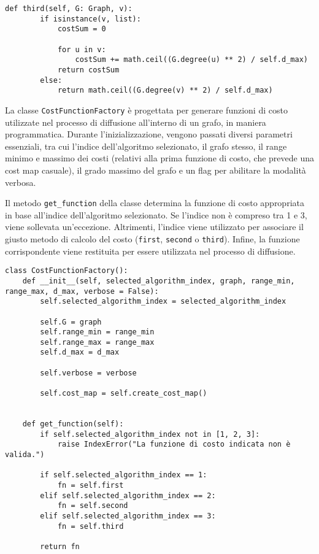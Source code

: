 \begin{code}
\begin{verbatim}
def third(self, G: Graph, v):
        if isinstance(v, list):
            costSum = 0

            for u in v:
                costSum += math.ceil((G.degree(u) ** 2) / self.d_max)
            return costSum
        else:
            return math.ceil((G.degree(v) ** 2) / self.d_max)
\end{verbatim}
\end{code}

La classe \texttt{CostFunctionFactory} è progettata per generare funzioni di costo utilizzate nel processo di diffusione all'interno di un grafo, in maniera programmatica. Durante l'inizializzazione, vengono passati diversi parametri essenziali, tra cui l'indice dell'algoritmo selezionato, il grafo stesso, il range minimo e massimo dei costi (relativi alla prima funzione di costo, che prevede una cost map casuale), il grado massimo del grafo e un flag per abilitare la modalità verbosa.

Il metodo \texttt{get_function} della classe determina la funzione di costo appropriata in base all'indice dell'algoritmo selezionato. Se l'indice non è compreso tra 1 e 3, viene sollevata un'eccezione. Altrimenti, l'indice viene utilizzato per associare il giusto metodo di calcolo del costo (\texttt{first}, \texttt{second} o \texttt{third}). Infine, la funzione corrispondente viene restituita per essere utilizzata nel processo di diffusione.

\begin{code}
\begin{verbatim}
class CostFunctionFactory():
    def __init__(self, selected_algorithm_index, graph, range_min, range_max, d_max, verbose = False):
        self.selected_algorithm_index = selected_algorithm_index

        self.G = graph
        self.range_min = range_min
        self.range_max = range_max
        self.d_max = d_max

        self.verbose = verbose

        self.cost_map = self.create_cost_map()
        

    def get_function(self):
        if self.selected_algorithm_index not in [1, 2, 3]:
            raise IndexError("La funzione di costo indicata non è valida.")

        if self.selected_algorithm_index == 1:
            fn = self.first
        elif self.selected_algorithm_index == 2:
            fn = self.second
        elif self.selected_algorithm_index == 3:
            fn = self.third

        return fn
\end{verbatim}
\end{code}


